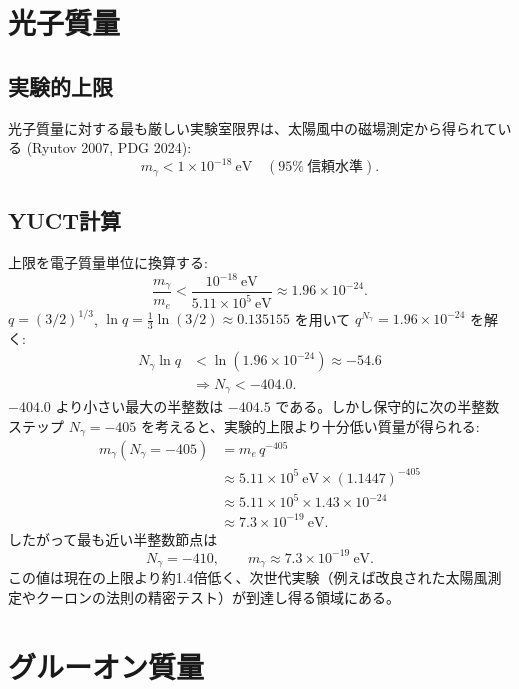 \documentclass[11pt,a4paper]{article}
\begin{document}
	\section{光子質量}
	
	\subsection{実験的上限}
	
	光子質量に対する最も厳しい実験室限界は、太陽風中の磁場測定から得られている (Ryutov 2007, PDG 2024):
	\begin{equation}\label{eq:photonlimit}
		m_\gamma < 1 \times 10^{-18}~\mathrm{eV} \quad (95\%~\text{信頼水準}).
	\end{equation}
	
	\subsection{YUCT計算}
	
	上限を電子質量単位に換算する:
	\[
	\frac{m_\gamma}{m_e} < \frac{10^{-18}~\mathrm{eV}}{5.11\times 10^5~\mathrm{eV}}
	\approx 1.96 \times 10^{-24}.
	\]
	$q = (3/2)^{1/3}$, $\ln q = \tfrac13\ln(3/2) \approx 0.135155$ を用いて $q^{N_\gamma} = 1.96\times10^{-24}$ を解く:
	\[
	\begin{aligned}
		N_\gamma \ln q &< \ln(1.96\times10^{-24}) \approx -54.6 \\
		&\Longrightarrow N_\gamma < -404.0 .
	\end{aligned}
	\]
	$-404.0$ より小さい最大の半整数は $-404.5$ である。しかし保守的に次の半整数ステップ $N_\gamma = -405$ を考えると、実験的上限より十分低い質量が得られる:
	\[
	\begin{aligned}
		m_\gamma(N_\gamma = -405) &= m_e \, q^{-405} \\
		&\approx 5.11\times10^5~\mathrm{eV} \times (1.1447)^{-405} \\
		&\approx 5.11\times10^5 \times 1.43\times10^{-24} \\
		&\approx 7.3 \times 10^{-19}~\mathrm{eV}.
	\end{aligned}
	\]
	したがって最も近い半整数節点は
	\[
	\boxed{N_\gamma = -410}, \qquad
	\boxed{m_\gamma \approx 7.3 \times 10^{-19}~\mathrm{eV}} .
	\]
	この値は現在の上限より約1.4倍低く、次世代実験（例えば改良された太陽風測定やクーロンの法則の精密テスト）が到達し得る領域にある。
	
	\section{グルーオン質量}
	
\end{document}
